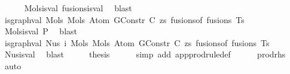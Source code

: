 \begin{isabellebody}
\ \ \ \ \isamarkupfalse%
\ Mols{}{\isacharunderscore}{\kern0pt}is{\isacharunderscore}{\kern0pt}val\ fusions{\isacharunderscore}{\kern0pt}is{\isacharunderscore}{\kern0pt}val\ \isamarkupfalse%
\ blast\isanewline
\isanewline
\ \ \isamarkupfalse%
\ \isamarkupfalse%
\ {\isachardoublequoteopen}is{\isacharunderscore}{\kern0pt}graph{\isacharunderscore}{\kern0pt}val\ {\isacharparenleft}{\kern0pt}Mols{}\ {\isacharparenleft}{\kern0pt}Mols{}\ {\isacharparenleft}{\kern0pt}Atom\ {\isacharparenleft}{\kern0pt}GConstr\ C{\isacharparenright}{\kern0pt}\ zs{\isacharparenright}{\kern0pt}\ {\isacharparenleft}{\kern0pt}fusions{\isacharunderscore}{\kern0pt}of\ fusions{\isacharparenright}{\kern0pt}{\isacharparenright}{\kern0pt}\ Ts{\isacharparenright}{\kern0pt}{\isachardoublequoteclose}\isanewline
\ \ \ \ \isamarkupfalse%
\ Mols{}{\isacharunderscore}{\kern0pt}is{\isacharunderscore}{\kern0pt}val\ P{}\ \isamarkupfalse%
\ blast\isanewline
\isanewline
\ \ \isamarkupfalse%
\ \isamarkupfalse%
\ {\isachardoublequoteopen}is{\isacharunderscore}{\kern0pt}graph{\isacharunderscore}{\kern0pt}val\ {\isacharparenleft}{\kern0pt}Nus{}\ i\ {\isacharparenleft}{\kern0pt}Mols{}\ {\isacharparenleft}{\kern0pt}Mols{}\ {\isacharparenleft}{\kern0pt}Atom\ {\isacharparenleft}{\kern0pt}GConstr\ C{\isacharparenright}{\kern0pt}\ zs{\isacharparenright}{\kern0pt}\ {\isacharparenleft}{\kern0pt}fusions{\isacharunderscore}{\kern0pt}of\ fusions{\isacharparenright}{\kern0pt}{\isacharparenright}{\kern0pt}\ Ts{\isacharparenright}{\kern0pt}{\isacharparenright}{\kern0pt}{\isachardoublequoteclose}\isanewline
\ \ \ \ \isamarkupfalse%
\ Nus{\isacharunderscore}{\kern0pt}is{\isacharunderscore}{\kern0pt}val\ \isamarkupfalse%
\ blast\isanewline
\isanewline
\ \ \isamarkupfalse%
\ \isamarkupfalse%
\ {\isacharquery}{\kern0pt}thesis\isanewline
\ \ \ \ \isamarkupfalse%
\ {\isacharparenleft}{\kern0pt}simp\ add{\isacharcolon}{\kern0pt}\ app{\isacharunderscore}{\kern0pt}prodrule{\isacharunderscore}{\kern0pt}def{\isacharparenright}{\kern0pt}\isanewline
\ \ \ \ \isamarkupfalse%
\ prod{\isacharunderscore}{\kern0pt}rhs\ \isamarkupfalse%
\ auto\isanewline
{}\isamarkupfalse%
%
\endisatagproof
{\isafoldproof}%
%
\isadelimproof
\isanewline

\end{isabellebody}
